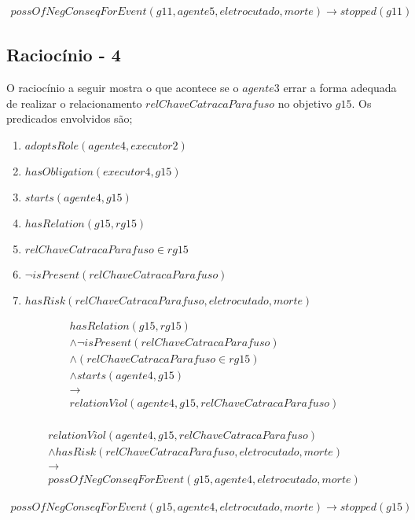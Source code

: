 \begin{eqnarray}
	possOfNegConseqForEvent(g11,agente5,eletrocutado,morte) \to stopped(g11)
\end{eqnarray}
\subsection{Raciocínio - 4} 
\label{raciocinio4}
O raciocínio a seguir mostra o que acontece se o $agente3$ errar a forma adequada de realizar o relacionamento $relChaveCatracaParafuso$ no objetivo $g15$. Os predicados envolvidos são;

\begin{enumerate}
	\item $adoptsRole(agente4,executor2)$
	\item $hasObligation(executor4,g15)$	
	\item $starts(agente4,g15)$ 
	\item $hasRelation(g15,rg15)$
	\item $relChaveCatracaParafuso \in rg15$	
	\item $\neg isPresent(relChaveCatracaParafuso)$
	\item $hasRisk(relChaveCatracaParafuso,eletrocutado,morte)$
\end{enumerate}

\begin{eqnarray}
	hasRelation(g15,rg15) \nonumber \\
	\wedge \neg isPresent(relChaveCatracaParafuso)  \nonumber \\ 
	\wedge (relChaveCatracaParafuso \in rg15) \nonumber \\
	\wedge starts(agente4,g15) \nonumber \\ 
	\to \nonumber \\ 
	relationViol(agente4,g15,relChaveCatracaParafuso) \nonumber \\
\end{eqnarray}

\begin{eqnarray}\nonumber
	relationViol(agente4,g15,relChaveCatracaParafuso) \nonumber \\ 
	 \wedge hasRisk(relChaveCatracaParafuso,eletrocutado,morte) \nonumber \\ 
	\to \nonumber \\ 
	possOfNegConseqForEvent(g15,agente4,eletrocutado,morte)
\end{eqnarray}

\begin{eqnarray}
	possOfNegConseqForEvent(g15,agente4,eletrocutado,morte) \to stopped(g15)
\end{eqnarray}

